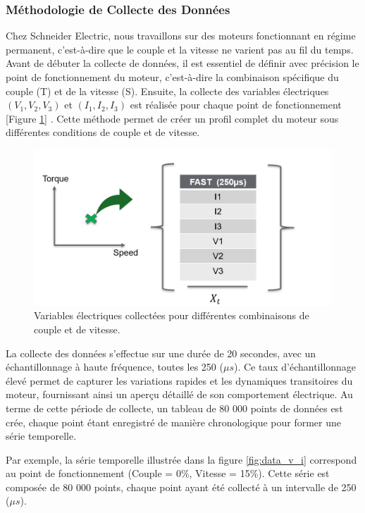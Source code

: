 \subsubsection*{Méthodologie de Collecte des Données}

Chez Schneider Electric, nous travaillons sur des moteurs fonctionnant en
régime permanent, c'est-à-dire que le couple et la vitesse ne varient pas au
fil du temps. Avant de débuter la collecte de données, il est essentiel de
définir avec précision le point de fonctionnement du moteur, c’est-à-dire la
combinaison spécifique du couple (T) et de la vitesse (S). Ensuite, la collecte
des variables électriques \((V_1, V_2, V_3)\) et \((I_1, I_2, I_3)\) est
réalisée pour chaque point de fonctionnement [Figure \ref{fig:speed_couple}] .
Cette méthode permet de créer un profil complet du moteur sous différentes
conditions de couple et de vitesse.

\begin{figure}[hbt!]
  \centering
  \includegraphics[width=13cm]{images_pfe/speed_couple.png}
  \caption{Variables électriques collectées pour différentes combinaisons de couple et de vitesse.}
  \label{fig:speed_couple}
\end{figure}
\FloatBarrier

La collecte des données s'effectue sur une durée de 20 secondes, avec un
échantillonnage à haute fréquence, toutes les 250 (\(\mu s\)). Ce taux
d'échantillonnage élevé permet de capturer les variations rapides et les
dynamiques transitoires du moteur, fournissant ainsi un aperçu détaillé de son
comportement électrique. Au terme de cette période de collecte, un tableau de
80 000 points de données est crée, chaque point étant enregistré de manière
chronologique pour former une série temporelle.

Par exemple, la série temporelle illustrée dans la figure \ref{fig:data_v_i}
correspond au point de fonctionnement (Couple = 0\%, Vitesse = 15\%). Cette
série est composée de 80 000 points, chaque point ayant été collecté à un
intervalle de 250 (\(\mu s\)).

